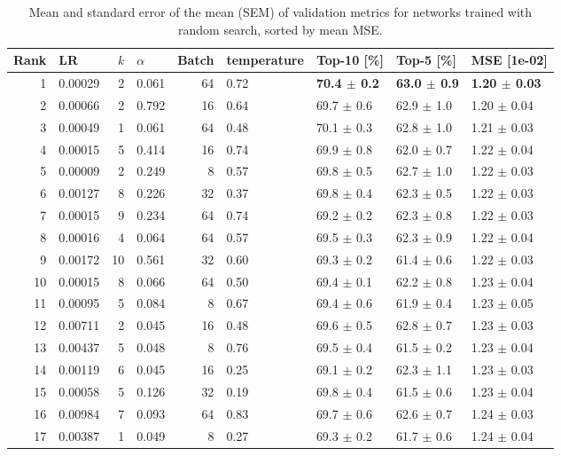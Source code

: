 \begin{table}[h]
\caption{Mean and standard error of the mean (SEM) of validation metrics for networks trained with random search, sorted by mean MSE. }
\label{tab:randomsearch}
\begin{tabular}{rlrlrllll}
\toprule
Rank & LR & $k$ & $\alpha$ & Batch & temperature & Top-10 [\%] & Top-5 [\%] & MSE [1e-02] \\
\midrule
1 & 0.00029 & 2 & 0.061 & 64 & 0.72 & \textbf{70.4 $\pm$ 0.2} & \textbf{63.0 $\pm$ 0.9} & \textbf{1.20 $\pm$ 0.03} \\
2 & 0.00066 & 2 & 0.792 & 16 & 0.64 & 69.7 $\pm$ 0.6 & 62.9 $\pm$ 1.0 & 1.20 $\pm$ 0.04 \\
3 & 0.00049 & 1 & 0.061 & 64 & 0.48 & 70.1 $\pm$ 0.3 & 62.8 $\pm$ 1.0 & 1.21 $\pm$ 0.03 \\
4 & 0.00015 & 5 & 0.414 & 16 & 0.74 & 69.9 $\pm$ 0.8 & 62.0 $\pm$ 0.7 & 1.22 $\pm$ 0.04 \\
5 & 0.00009 & 2 & 0.249 & 8 & 0.57 & 69.8 $\pm$ 0.5 & 62.7 $\pm$ 1.0 & 1.22 $\pm$ 0.03 \\
6 & 0.00127 & 8 & 0.226 & 32 & 0.37 & 69.8 $\pm$ 0.4 & 62.3 $\pm$ 0.5 & 1.22 $\pm$ 0.03 \\
7 & 0.00015 & 9 & 0.234 & 64 & 0.74 & 69.2 $\pm$ 0.2 & 62.3 $\pm$ 0.8 & 1.22 $\pm$ 0.03 \\
8 & 0.00016 & 4 & 0.064 & 64 & 0.57 & 69.5 $\pm$ 0.3 & 62.3 $\pm$ 0.9 & 1.22 $\pm$ 0.04 \\
9 & 0.00172 & 10 & 0.561 & 32 & 0.60 & 69.3 $\pm$ 0.2 & 61.4 $\pm$ 0.6 & 1.22 $\pm$ 0.03 \\
10 & 0.00015 & 8 & 0.066 & 64 & 0.50 & 69.4 $\pm$ 0.1 & 62.2 $\pm$ 0.8 & 1.23 $\pm$ 0.04 \\
11 & 0.00095 & 5 & 0.084 & 8 & 0.67 & 69.4 $\pm$ 0.6 & 61.9 $\pm$ 0.4 & 1.23 $\pm$ 0.05 \\
12 & 0.00711 & 2 & 0.045 & 16 & 0.48 & 69.6 $\pm$ 0.5 & 62.8 $\pm$ 0.7 & 1.23 $\pm$ 0.03 \\
13 & 0.00437 & 5 & 0.048 & 8 & 0.76 & 69.5 $\pm$ 0.4 & 61.5 $\pm$ 0.2 & 1.23 $\pm$ 0.04 \\
14 & 0.00119 & 6 & 0.045 & 16 & 0.25 & 69.1 $\pm$ 0.2 & 62.3 $\pm$ 1.1 & 1.23 $\pm$ 0.03 \\
15 & 0.00058 & 5 & 0.126 & 32 & 0.19 & 69.8 $\pm$ 0.4 & 61.5 $\pm$ 0.6 & 1.23 $\pm$ 0.04 \\
16 & 0.00984 & 7 & 0.093 & 64 & 0.83 & 69.7 $\pm$ 0.6 & 62.6 $\pm$ 0.7 & 1.24 $\pm$ 0.03 \\
17 & 0.00387 & 1 & 0.049 & 8 & 0.27 & 69.3 $\pm$ 0.2 & 61.7 $\pm$ 0.6 & 1.24 $\pm$ 0.04 \\

\end{tabular}
\end{table}
